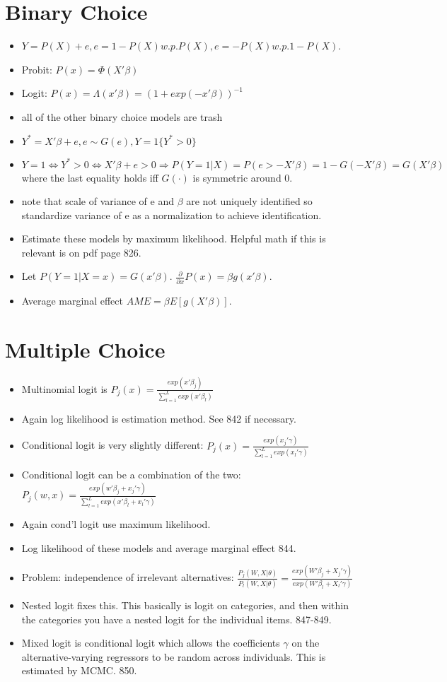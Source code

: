 \documentclass[11pt]{article} %
\begin{document}
\section{Binary Choice}
\begin{itemize}
\item $Y = P(X) + e, e = 1-P(X) w.p. P(X), e=-P(X) w.p. 1-P(X)$.
\item Probit: $P(x) = \Phi(X'\beta)$
\item Logit: $P(x) = \Lambda(x'\beta) = (1+exp(-x'\beta))^{-1}$
\item all of the other binary choice models are trash
\item $Y^{*} = X'\beta + e, e\sim G(e), Y = 1\{Y^{*}>0 \}$
\item $Y=1 \iff Y^{*}>0 \iff X'\beta+e>0 \Rightarrow P(Y=1|X) = P(e>-X'\beta) = 1-G(-X'\beta) = G(X'\beta) $ where the last equality holds iff $G(\cdot)$ is symmetric around 0.
\item note that scale of variance of e and $\beta$ are not uniquely identified so standardize variance of e as a normalization to achieve identification.
\item Estimate these models by maximum likelihood. Helpful math if this is relevant is on pdf page 826.
\item Let $P(Y=1|X=x) = G(x'\beta).$ $\frac{\partial}{\partial x}P(x) = \beta g(x'\beta)$.
\item Average marginal effect $AME = \beta E[g(X'\beta)]$.
\end{itemize}

\section{Multiple Choice}
\begin{itemize}
\item Multinomial logit is $P_j(x) = \frac{exp(x'\beta_j)}{\sum_{l=1}^{L}exp(x'\beta_l)}$
\item Again log likelihood is estimation method. See 842 if necessary.
\item Conditional logit is very slightly different: $P_j(x) = \frac{exp(x_j'\gamma)}{\sum_{l=1}^{L}exp(x_l'\gamma)}$
\item Conditional logit can be a combination of the two: $P_j(w,x) = \frac{exp(w'\beta_j + x_j'\gamma)}{\sum_{l=1}^{L}exp(x'\beta_l +x_l'\gamma)}$
\item Again cond'l logit use maximum likelihood.
\item Log likelihood of these models and average marginal effect 844.
\item Problem: independence of irrelevant alternatives: $\frac{P_j(W,X|\theta)}{P_l(W,X|\theta)} = \frac{exp(W'\beta_j + X_j' \gamma)}{exp(W'\beta_l + X_l' \gamma)}$
\item Nested logit fixes this. This basically is logit on categories, and then within the categories you have a nested logit for the individual items. 847-849.
\item Mixed logit is conditional logit which allows the coefficients $\gamma$ on the alternative-varying regressors to be random across individuals. This is estimated by MCMC. 850.
\end{itemize}
\end{document}
